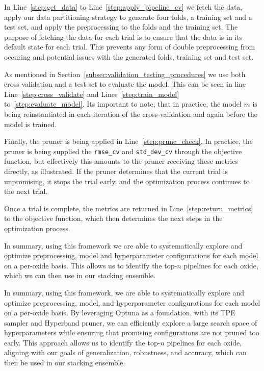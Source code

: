 In Line~\ref{step:get_data} to Line~\ref{step:apply_pipeline_cv} we fetch the data, apply our data partitioning strategy to generate four folds, a training set and a test set, and apply the preprocessing to the folds and the training set.
The purpose of fetching the data for each trial is to ensure that the data is in its default state for each trial.
This prevents any form of double preprocessing from occuring and potential issues with the generated folds, training set and test set.

As mentioned in Section~\ref{subsec:validation_testing_procedures} we use both cross validation and a test set to evaluate the model.
This can be seen in line Line~\ref{step:cross_validate} and Lines~\ref{step:train_model} to~\ref{step:evaluate_model}.
Its important to note, that in practice, the model $m$ is being reinstantiated in each iteration of the cross-validation and again before the model is trained.

Finally, the pruner is being applied in Line~\ref{step:prune_check}.
In practice, the pruner is being supplied the \texttt{rmse\_cv} and \texttt{std\_dev\_cv} through the objective function, but effectively this amounts to the pruner receiving these metrics directly, as illustrated.
If the pruner determines that the current trial is unpromising, it stops the trial early, and the optimization process continues to the next trial.

Once a trial is complete, the metrics are returned in Line~\ref{step:return_metrics} to the objective function, which then determines the next steps in the optimization process.

In summary, using this framework we are able to systematically explore and optimize preprocessing, model and hyperparameter configurations for each model on a per-oxide basis.
This allows us to identify the top-$n$ pipelines for each oxide, which we can then use in our stacking ensemble. 

In summary, using this framework, we are able to systematically explore and optimize preprocessing, model, and hyperparameter configurations for each model on a per-oxide basis. 
By leveraging Optuna as a foundation, with its TPE sampler and Hyperband pruner, we can efficiently explore a large search space of hyperparameters while ensuring that promising configurations are not pruned too early. 
This approach allows us to identify the top-$n$ pipelines for each oxide, aligning with our goals of generalization, robustness, and accuracy, which can then be used in our stacking ensemble.

